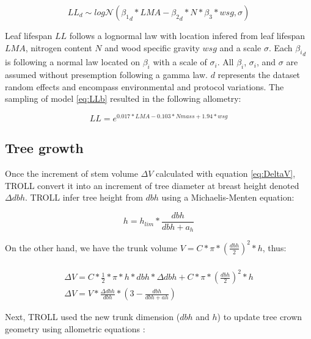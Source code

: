 \documentclass[]{article}
\theoremstyle{definition}
\theoremstyle{definition}
\theoremstyle{remark}
\begin{document}
\begin{equation}
  LL_{d} \sim log\mathcal{N}({\beta_1}_d*LMA - {\beta_2}_d*N*\beta_3*wsg, \sigma)
  \label{eq:LLb}
\end{equation}

Leaf lifespan \(LL\) follows a lognormal law with location infered from
leaf lifespan \(LMA\), nitrogen content \(N\) and wood specific gravity
\(wsg\) and a scale \(\sigma\). Each \({\beta_i}_d\) is following a
normal law located on \(\beta_i\) with a scale of \(\sigma_i\). All
\(\beta_i\), \(\sigma_i\), and \(\sigma\) are assumed without
presemption following a gamma law. \(d\) represents the dataset random
effects and encompass environmental and protocol variations. The
sampling of model \eqref{eq:LLb} resulted in the following allometry:

\begin{equation}
  LL = e^{0.017*LMA - 0.103*Nmass + 1.94*wsg}
  \label{eq:LL}
\end{equation}

\subsection{Tree growth}\label{tree-growth}

Once the increment of stem volume \(\Delta V\) calculated with equation
\eqref{eq:DeltaV}, TROLL convert it into an increment of tree diameter at
breast height denoted \(\Delta dbh\). TROLL infer tree height from
\(dbh\) using a Michaelis-Menten equation:

\begin{equation}
  h = h_{lim}*\frac{dbh}{dbh + a_h}
  \label{eq:h}
\end{equation}

On the other hand, we have the trunk volume
\(V = C * \pi * (\frac{dbh}{2})^2*h\), thus:

\begin{equation}
  \begin{array}{c} \\
    \Delta V = C*\frac{1}{2}*\pi*h*dbh*\Delta dbh + C * \pi * (\frac{dbh}{2})^2*h \\
    \Delta V = V*\frac{\Delta dbh}{dbh}*(3-\frac{dbh}{dbh + ah})
  \end{array}
  \label{eq:Deltadbh}
\end{equation}

Next, TROLL used the new trunk dimension (\(dbh\) and \(h\)) to update
tree crown geometry using allometric equations \citep{Chave2005}:
\end{document}

